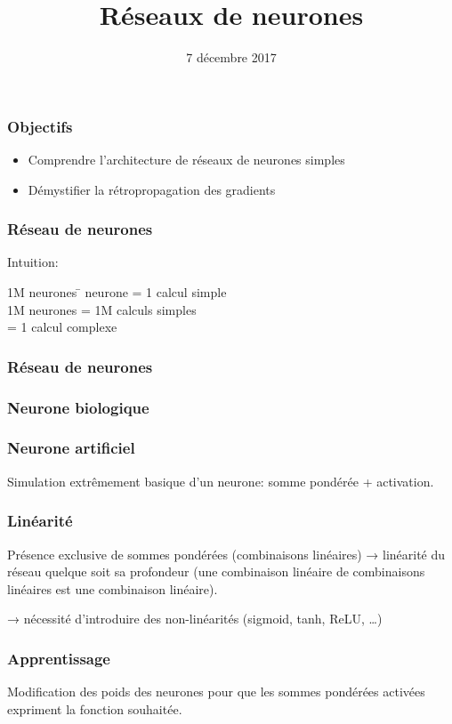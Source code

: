 \documentclass{formation}
\title{Réseaux de neurones}
\date{7 décembre 2017}
\begin{document}
\maketitle
\begin{frame}
  \frametitle{Objectifs}
  \begin{itemize}
  \item Comprendre l'architecture de réseaux de neurones simples
  \item Démystifier la rétropropagation des gradients
  \end{itemize}
\end{frame}

\begin{frame}
  \frametitle{Réseau de neurones}
  Intuition:
  \begin{tabbing}
    1M neurones \= neurone \>= 1 calcul simple\\
    1M neurones \>= 1M calculs simples\\
    \>= 1 calcul complexe\\
  \end{tabbing}
\end{frame}

\begin{frame}
  \frametitle{Réseau de neurones}
\end{frame}

\begin{frame}
  \frametitle{Neurone biologique}
\end{frame}

\begin{frame}
  \frametitle{Neurone artificiel}
  Simulation extrêmement basique d'un neurone: somme pondérée +
  activation.
\end{frame}

\begin{frame}
  \frametitle{Linéarité}
  Présence exclusive de sommes pondérées (combinaisons linéaires) →
  linéarité du réseau quelque soit sa profondeur (une combinaison
  linéaire de combinaisons linéaires est une combinaison linéaire).

  → nécessité d'introduire des non-linéarités (sigmoid, tanh, ReLU, …)
\end{frame}

\begin{frame}
  \frametitle{Apprentissage}
  Modification des poids des neurones pour que les sommes pondérées
  activées expriment la fonction souhaitée.
\end{frame}
\end{document}
